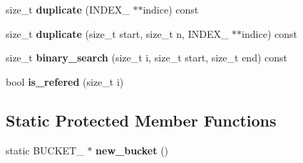 \begin{CompactItemize}
\item 
\hypertarget{classbbt__string_f97a1811c1ff2df4682db4dea4f34b0a}{
size\_\-t \textbf{duplicate} (INDEX\_\- $\ast$$\ast$indice) const }
\label{classbbt__string_f97a1811c1ff2df4682db4dea4f34b0a}

\item 
\hypertarget{classbbt__string_f6fde6bef4354adfc8e1744e97f686a2}{
size\_\-t \textbf{duplicate} (size\_\-t start, size\_\-t n, INDEX\_\- $\ast$$\ast$indice) const }
\label{classbbt__string_f6fde6bef4354adfc8e1744e97f686a2}

\item 
\hypertarget{classbbt__string_4d1bca27e60258f0f9709e2b67c7ac8c}{
size\_\-t \textbf{binary\_\-search} (size\_\-t i, size\_\-t start, size\_\-t end) const }
\label{classbbt__string_4d1bca27e60258f0f9709e2b67c7ac8c}

\item 
\hypertarget{classbbt__string_badb9ff60544a1a510b813eb73ea28b1}{
bool \textbf{is\_\-refered} (size\_\-t i)}
\label{classbbt__string_badb9ff60544a1a510b813eb73ea28b1}

\end{CompactItemize}
\subsection*{Static Protected Member Functions}
\begin{CompactItemize}
\item 
\hypertarget{classbbt__string_ba4af9958273381c33fd7eb02601ee04}{
static BUCKET\_\- $\ast$ \textbf{new\_\-bucket} ()}
\label{classbbt__string_ba4af9958273381c33fd7eb02601ee04}

\end{CompactItemize}
